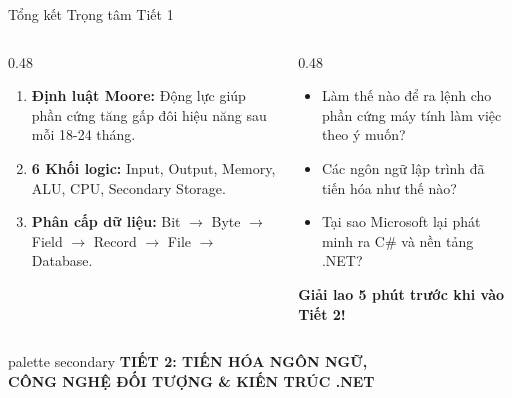 \documentclass[aspectratio=169, 10pt]{beamer}
\begin{document}
\begin{frame}{Tổng kết Trọng tâm Tiết 1}
  \begin{columns}[T]
    \begin{column}{0.48\textwidth}
      \begin{tcolorbox}[colback=UniLightBlue,colframe=UniNavy,title=\textbf{3 Khái niệm Cốt lõi Tiết 1}]
        \begin{enumerate}
          \item \textbf{Định luật Moore:} Động lực giúp phần cứng tăng gấp đôi hiệu năng sau mỗi 18-24 tháng.
          \item \textbf{6 Khối logic:} Input, Output, Memory, ALU, CPU, Secondary Storage.
          \item \textbf{Phân cấp dữ liệu:} Bit $\to$ Byte $\to$ Field $\to$ Record $\to$ File $\to$ Database.
        \end{enumerate}
      \end{tcolorbox}
    \end{column}
    \begin{column}{0.48\textwidth}
      \begin{tcolorbox}[colback=CSharpPurple!10,colframe=CSharpPurple,title=\textbf{Chuẩn bị bước sang Tiết 2}]
        \begin{itemize}
          \item Làm thế nào để ra lệnh cho phần cứng máy tính làm việc theo ý muốn?
          \item Các ngôn ngữ lập trình đã tiến hóa như thế nào?
          \item Tại sao Microsoft lại phát minh ra C\# và nền tảng .NET?
        \end{itemize}
        \vskip 2mm
        \centering \textbf{\color{UniOrange} Giải lao 5 phút trước khi vào Tiết 2!}
      \end{tcolorbox}
    \end{column}
  \end{columns}
\end{frame}

\begin{frame}
  \vfill
  \centering
  \begin{beamercolorbox}[sep=8pt,center,shadow=true,rounded=true]{palette secondary}
    \Huge \textbf{TIẾT 2: TIẾN HÓA NGÔN NGỮ,}\\[2mm]
    \Large \textbf{CÔNG NGHỆ ĐỐI TƯỢNG \& KIẾN TRÚC .NET}
  \end{beamercolorbox}
  \vfill
\end{frame}
\end{document}
